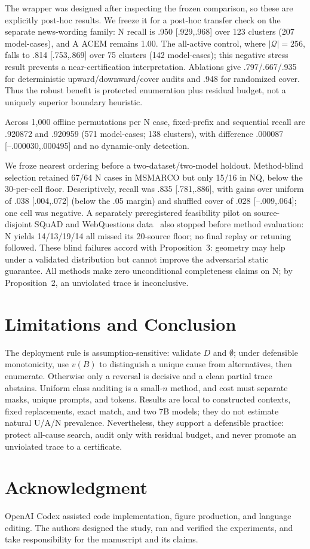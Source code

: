\documentclass{article}
\begin{document}
The wrapper was designed after inspecting the frozen comparison, so these are
explicitly post-hoc results. We freeze it for a post-hoc transfer check on the
separate news-wording family: N recall is .950 [.929,.968] over 123 clusters
(207 model-cases), and A ACEM remains 1.00. The all-active control, where
$|\mathcal{Q}|=256$, falls to .814 [.753,.869] over 75 clusters (142
model-cases);
this negative stress result prevents a near-certification interpretation.
Ablations give .797/.667/.935 for deterministic upward/downward/cover audits
and .948 for randomized cover. Thus the robust benefit is protected enumeration
plus residual budget, not a uniquely superior boundary heuristic.

Across 1,000 offline permutations per N case, fixed-prefix and sequential recall
are .920872 and .920959 (571 model-cases; 138 clusters), with difference .000087
[--.000030,.000495] and no dynamic-only detection.

We froze nearest ordering before a two-dataset/two-model holdout. Method-blind
selection retained 67/64 N cases in MSMARCO but only 15/16 in NQ, below the
30-per-cell floor. Descriptively, recall was .835 [.781,.886], with gains over
uniform of .038 [.004,.072] (below the .05 margin) and shuffled cover of .028
[--.009,.064]; one cell was negative. A separately preregistered feasibility
pilot on source-disjoint SQuAD and WebQuestions
data~\cite{rajpurkar2016squad,berant2013webquestions} also stopped before method
evaluation: N yields 14/13/19/14 all missed its 20-source floor; no final replay
or retuning followed. These blind failures accord with Proposition~3: geometry
may help under a validated distribution but cannot improve the adversarial
static guarantee. All methods make zero unconditional completeness claims on N;
by Proposition~2, an unviolated trace is inconclusive.

\section{Limitations and Conclusion}

The deployment rule is assumption-sensitive: validate $D$ and $\emptyset$;
under defensible monotonicity, use $v(B)$ to distinguish a unique cause from
alternatives, then enumerate. Otherwise only a reversal is decisive and a clean
partial trace abstains. Uniform class auditing is a small-$n$ method, and cost
must separate masks, unique prompts, and tokens. Results are local to constructed
contexts, fixed replacements, exact match, and two 7B models; they do not
estimate natural U/A/N prevalence. Nevertheless, they support a defensible
practice: protect all-cause search, audit only with residual budget, and never
promote an unviolated trace to a certificate.

\section{Acknowledgment}
OpenAI Codex assisted code implementation, figure production, and language
editing. The authors designed the study, ran and verified the experiments, and
take responsibility for the manuscript and its claims.

\clearpage


\end{document}

